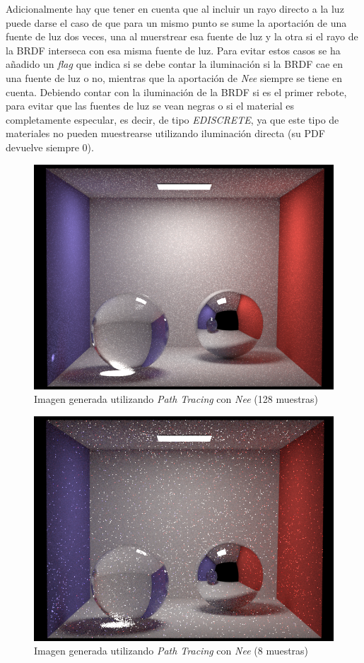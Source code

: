 \documentclass[10pt,oneside,a4paper]{article}
\begin{document}
Adicionalmente hay que tener en cuenta que al incluir un rayo directo a la luz puede darse el caso de que para un mismo punto se sume la aportación de una fuente de luz dos veces, una al muerstrear esa fuente de luz y la otra si el rayo de la BRDF interseca con esa misma fuente de luz. Para evitar estos casos se ha añadido un \textit{flag} que indica si se debe contar la iluminación si la BRDF cae en una fuente de luz o no, mientras que la aportación de \textit{Nee} siempre se tiene en cuenta. Debiendo contar con la iluminación de la BRDF si es el primer rebote, para evitar que las fuentes de luz se vean negras o si el material es completamente especular, es decir, de tipo \textit{EDISCRETE}, ya que este tipo de materiales no pueden muestrearse utilizando iluminación directa (su  PDF devuelve siempre 0).\\

\begin{figure}[h]
\centering
\includegraphics[width=.6\linewidth]{images/cbox_pathNee_128.png}
\caption{Imagen generada utilizando \textit{Path Tracing} con \textit{Nee} (128 muestras)}
\label{fig:disp}
\end{figure}

\begin{figure}[h]
\centering
\includegraphics[width=.6\linewidth]{images/cbox_pathNee_8.png}
\caption{Imagen generada utilizando \textit{Path Tracing} con \textit{Nee} (8 muestras)}
\label{fig:disp}
\end{figure}
\end{document}
